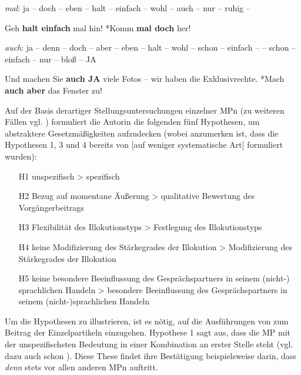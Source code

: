 \begin{exe}
	\ex\label{34} \textit{mal}: ja – doch – eben – halt – einfach – wohl – auch – nur – ruhig –  
		\begin{xlist}	
			\ex\label{34a} Geh \textbf{halt einfach }mal hin!
			\ex\label{34b} *Komm \textbf{mal doch} her!
		\end{xlist}
\end{exe}
	
\begin{exe}
	\ex\label{35} \textit{auch}: ja – denn – doch – aber – eben – halt – wohl – schon – einfach –  – schon
 			– einfach – nur – bloß – JA	 
		\begin{xlist}	
			\ex\label{35a} Und machen Sie \textbf{auch JA} viele Fotos – wir haben die Exklusivrechte.
			\ex\label{35b} *Mach \textbf{auch aber }das Fenster zu! 
			\hfill\hbox {\citet[286/288/287]{Thurmair1989}}
		\end{xlist}
\end{exe}															  
Auf der Basis derartiger Stellungsuntersuchungen einzelner MPn (zu weiteren Fällen vgl. \citealt[285-288]{Thurmair1989}) formuliert die Autorin die folgenden fünf Hypothesen, um abstraktere Gesetzmäßigkeiten aufzudecken (wobei anzumerken ist, dass die Hypothesen 1, 3 und 4 bereits von \citealt{Dahl1988} $[$auf weniger systematische Art$]$ formuliert wurden):

\begin{exe}
	\ex\label{36}
\begin{itemize}
	\item[H1] unspezifisch > spezifisch
	\item[H2] Bezug auf momentane Äußerung > qualitative Bewertung des Vorgän\-gerbeitrags	
	\item[H3] Flexibilität des Illokutionstyps > Festlegung des Illokutionstyps
	\item[H4] keine Modifizierung des Stärkegrades der Illokution > Modifizierung des Stärkegrades der Illokution
	\item[H5] keine besondere Beeinflussung des Gesprächspartners in seinem \linebreak (nicht-)
sprachlichen Handeln > besondere Beeinflussung des Ge\-sprächspartners in seinem (nicht-)sprachlichen Handeln  
\end{itemize}
\end{exe}
Um die Hypothesen zu illustrieren, ist es nötig, auf die Ausführungen von \citet{Thurmair1989} zum Beitrag der Einzelpartikeln einzugehen. Hypothese 1 sagt aus, dass die MP mit der unspezifischsten Bedeutung in einer Kombination an erster Stelle steht (vgl. dazu auch schon \citealt[225, 238, 242, 255, 265]{Dahl1988}). Diese These findet ihre Bestätigung beispielsweise darin, dass \textit{denn} stets vor allen anderen MPn auftritt.

